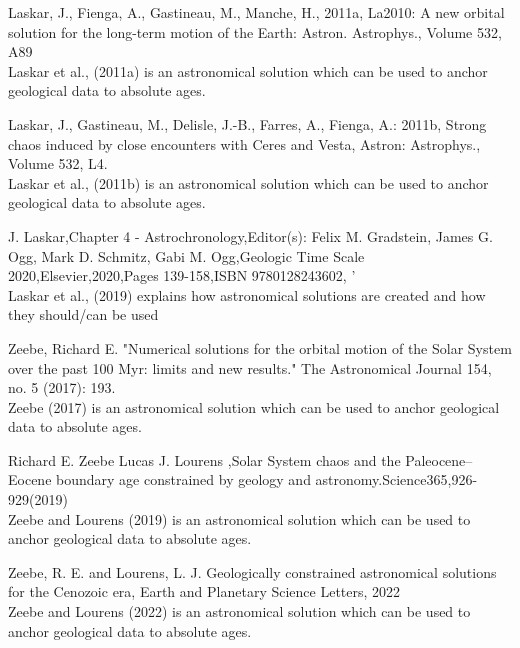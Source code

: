 \documentclass[a4paper]{book}
\begin{document}
\begin{References}
Laskar, J., Fienga, A., Gastineau, M., Manche, H., 2011a,
La2010: A new orbital solution for the long-term motion of the Earth: Astron. Astrophys.,
Volume 532, A89 \\{}
Laskar et al., (2011a) is an astronomical solution which can be used to anchor geological data to absolute ages.

Laskar, J., Gastineau, M., Delisle, J.-B., Farres, A., Fienga, A.:
2011b, Strong chaos induced by close encounters with Ceres and Vesta, Astron: Astrophys.,
Volume 532, L4.  \\{}
Laskar et al., (2011b) is an astronomical solution which can be used to anchor geological data to absolute ages.

J. Laskar,Chapter 4 - Astrochronology,Editor(s): Felix M. Gradstein, James G. Ogg, Mark D. Schmitz, Gabi M. Ogg,Geologic Time Scale 2020,Elsevier,2020,Pages 139-158,ISBN 9780128243602,
'\\{}
Laskar et al., (2019) explains how astronomical solutions are created and how they should/can be used

Zeebe, Richard E. "Numerical solutions for the orbital motion of the Solar System over the past 100 Myr: limits and new results."
The Astronomical Journal 154, no. 5 (2017): 193.  \\{}
Zeebe (2017) is an astronomical solution which can be used to anchor geological data to absolute ages.

Richard E. Zeebe Lucas J. Lourens ,Solar System chaos and the Paleocene–Eocene boundary age constrained by geology and astronomy.Science365,926-929(2019)
\\{}
Zeebe and Lourens (2019) is an astronomical solution which can be used to anchor geological data to absolute ages.

Zeebe, R. E. and Lourens, L. J.
Geologically constrained astronomical solutions for the Cenozoic era,
Earth and Planetary Science Letters, 2022  \\{}
Zeebe and Lourens (2022) is an astronomical solution which can be used to anchor geological data to absolute ages.
\end{References}
\end{document}
